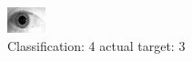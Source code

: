 \begin{figure}[h!]
\begin{center}
\includegraphics[width=0.60\columnwidth]{figures/ID1904_class_4_target_3.png}
\end{center}
\caption{ Classification: 4 actual target: 3}
\label{fig:ID1904_class_4_target_3}
\end{figure}
